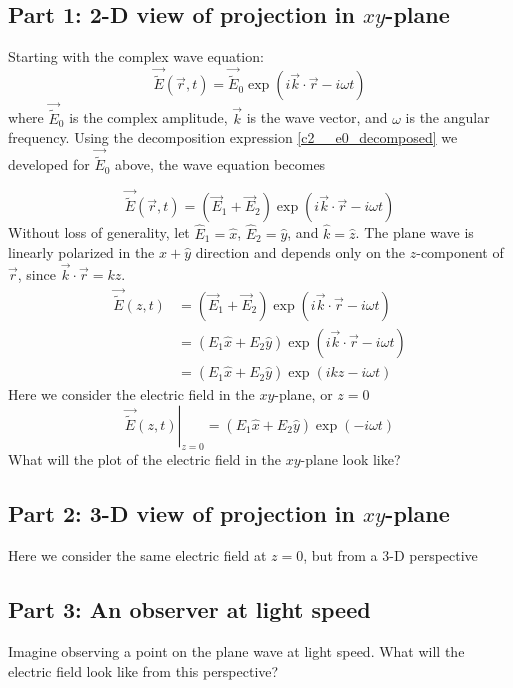 \documentclass{article}
\begin{document}
\subsection{Part 1: 2-D view of projection in $xy$-plane}
Starting with the complex wave equation:
\begin{equation}
    \vec{\widetilde{E}}\left(\vec{r},t\right) = \vec{\widetilde{E}}_0 \exp \left(i \vec{k} \cdot \vec{r} - i \omega t\right)
\end{equation}
where $\vec{\widetilde{E}}_0$ is the complex amplitude, $\vec{k}$ is the wave vector, and $\omega$ is the angular frequency.  Using the decomposition expression \eqref{c2__e0_decomposed} we developed for $\vec{\widetilde{E}}_0$ above, the wave equation becomes

\begin{equation}
    \vec{\widetilde{E}}\left(\vec{r},t\right) = \left(\vec{E}_1 + \vec{E}_2\right) \exp \left(i \vec{k} \cdot \vec{r} - i \omega t\right)
\end{equation}
Without loss of generality, let $\hat{E}_1=\hat{x}$, $\hat{E}_2=\hat{y}$, and $\hat{k}=\hat{z}$.   The plane wave is linearly polarized in the $\hat{x}+\hat{y}$ direction and depends only on the $z$-component of $\vec r$, since $\vec{k} \cdot \vec{r} = kz$.
\begin{align}
     \vec{\widetilde{E}}\left(z,t\right) &= \left(\vec{E}_1 + \vec{E}_2\right) \exp \left(i \vec{k} \cdot \vec{r} - i \omega t\right)\\
     &= \left(E_1\hat{x} + E_2\hat{y}\right) \exp \left(i \vec{k} \cdot \vec{r} - i \omega t\right)\\
     &= \left(E_1\hat{x} + E_2\hat{y}\right) \exp \left(i kz - i \omega t\right) 
\end{align}
Here we consider the electric field in the $xy$-plane, or $z=0$
\begin{equation}
     \left.\vec{\widetilde{E}}\left(z,t\right)\right\rvert_{z=0} = \left(E_1\hat{x} + E_2\hat{y}\right) \exp \left(- i \omega t\right) 
\end{equation}
What will the plot of the electric field in the $xy$-plane look like?

\subsection{Part 2: 3-D view of projection in $xy$-plane}
Here we consider the same electric field at $z=0$, but from a 3-D perspective

\subsection{Part 3: An observer at light speed}
Imagine observing a point on the plane wave at light speed.  What will the electric field look like from this perspective?
\end{document}
